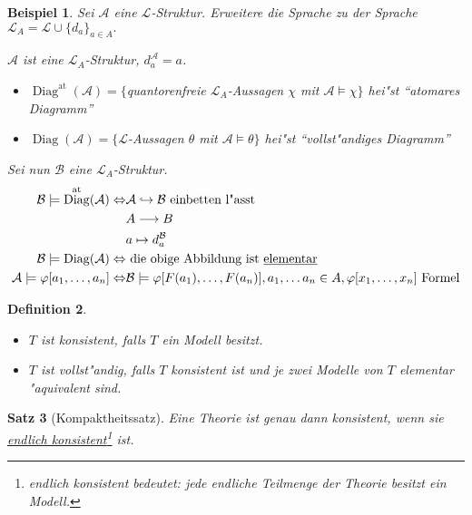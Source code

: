 \documentclass[a4paper,12pt,numbers=noenddot,parskip=full]{scrartcl}
\newcommand{\scrL}{\mathcal{L}}
\newcommand{\scrA}{\mathcal{A}}
\newcommand{\scrB}{\mathcal{B}}
\DeclareMathOperator{\Diag}{Diag}
\newcommand{\atdig}{\Diag^{\text{at}}}
\newcommand{\vdig}{\Diag}
\theoremstyle{dotless}
\newtheorem{theorem}{Satz}[section]
\newtheorem{definition}[theorem]{Definition}
\newtheorem{example}[theorem]{Beispiel}
\begin{document}
\begin{example}
	Sei $\scrA$ eine $\scrL$-Struktur. Erweitere die Sprache zu der Sprache $\scrL_A = \scrL \cup \{d_a\}_{a \in A}.$
	
	$\scrA$ ist eine $\scrL_A$-Struktur, $d_a^\scrA = a$.
	\begin{itemize}
		\item $\atdig(\scrA) = \{$quantorenfreie $\scrL_A$-Aussagen $\chi$ mit $\scrA \models \chi\}$ hei"st "`atomares Diagramm"'
		\item $\vdig (\scrA) = \{\scrL$-Aussagen $\theta$ mit $\scrA \models \theta\}$ hei"st "`vollst"andiges Diagramm"'
	\end{itemize}
	Sei nun $\scrB$ eine $\scrL_A$-Struktur.
	\begin{align*}
		\scrB \models \atdig(\scrA) \Leftrightarrow &\scrA \hookrightarrow \scrB \text{ einbetten l"asst}\\
		&A \longrightarrow B\\
		&a \mapsto d_a^\scrB\\
		\scrB \models \vdig(\scrA) \Leftrightarrow &\text{ die obige Abbildung ist \underline{elementar}}\\
		\scrA \models \varphi[a_1, \dots, a_n] \Leftrightarrow &\scrB \models \varphi [F(a_1), \dots, F(a_n)], a_1, \dots a_n \in A, \varphi[x_1, \dots, x_n] \text{ Formel}
	\end{align*}
\end{example}

\begin{definition}
	\begin{itemize}
		\item $T$ ist konsistent, falls $T$ ein Modell besitzt.
		\item $T$ ist vollst"andig, falls  $T$ konsistent ist und je zwei Modelle von $T$ elementar "aquivalent sind.
	\end{itemize}
\end{definition}

\begin{theorem}[Kompaktheitssatz]\label{satz:kompakt}
	Eine Theorie ist genau dann konsistent, wenn sie \underline{endlich konsistent}\footnote{endlich konsistent bedeutet: jede endliche Teilmenge der Theorie besitzt ein Modell.} ist.
\end{theorem}
\end{document}
